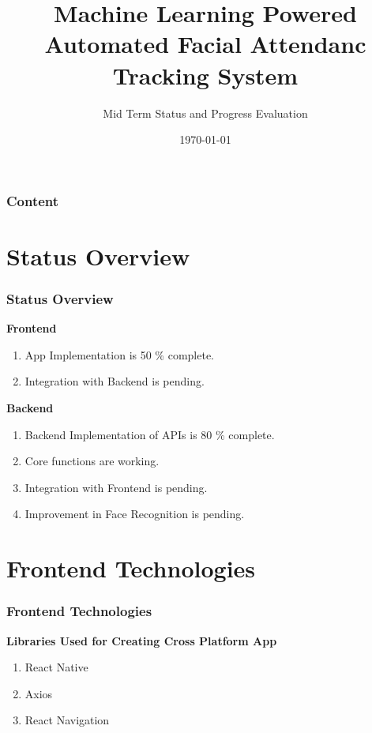 \documentclass[aspectratio=169]{beamer}
\title{Machine Learning Powered Automated Facial Attendanc Tracking System}
\author{Mid Term Status and Progress Evaluation}
\date{\today}
\begin{document}
\begin{frame}
	\titlepage
\end{frame}

\begin{frame}
	\frametitle{Content}
	\tableofcontents
\end{frame}

\section{Status Overview}

\begin{frame}
	\centering
	\frametitle{Status Overview}
	\begin{minipage}{0.95\textwidth}
		\textbf{Frontend}
		\begin{enumerate}
			\item App Implementation is 50 \% complete.
			\item Integration with Backend is pending.
		\end{enumerate}
		\textbf{Backend}
		\begin{enumerate}
			\item Backend Implementation of APIs is 80 \% complete.
			\item Core functions are working.
			\item Integration with Frontend is pending.
			\item Improvement in Face Recognition is pending.
		\end{enumerate}
	\end{minipage}
\end{frame}


\section{Frontend Technologies}
\begin{frame}
	\centering
	\frametitle{Frontend Technologies}
	\begin{minipage}{0.95\textwidth}
		\textbf{Libraries Used for Creating Cross Platform App}
		\begin{enumerate}
			\item React Native
			\item Axios
			\item React Navigation
		\end{enumerate}
	\end{minipage}
\end{frame}
\end{document}
